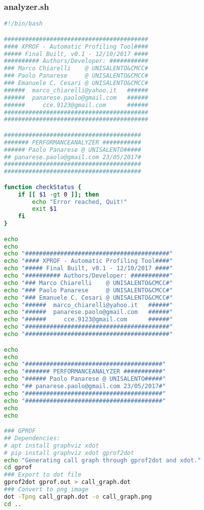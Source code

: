 \subsubsection{analyzer.sh}
\begin{lstlisting}[language=bash,breaklines=true]
#!/bin/bash

#########################################
#### XPROF - Automatic Profiling Tool####
##### Final Built, v0.1 - 12/10/2017 ####
########## Authors/Developer: ###########
### Marco Chiarelli    @ UNISALENTO&CMCC#
### Paolo Panarese     @ UNISALENTO&CMCC#
### Emanuele C. Cesari @ UNISALENTO&CMCC#
######  marco_chiarelli@yahoo.it   ######
######  panarese.paolo@gmail.com   ######
######     cce.9123@gmail.com      ######
#########################################
#########################################

#######################################
####### PERFORMANCEANALYZER ###########
###### Paolo Panarese @ UNISALENTO#####
## panarese.paolo@gmail.com 23/05/2017#
#######################################
#######################################

function checkStatus {
	if [[ $1 -gt 0 ]]; then
		echo "Error reached, Quit!"
		exit $1
	fi
}

echo
echo
echo "#########################################"
echo "#### XPROF - Automatic Profiling Tool####"
echo "##### Final Built, v0.1 - 12/10/2017 ####"
echo "########## Authors/Developer: ###########"
echo "### Marco Chiarelli    @ UNISALENTO&CMCC#"
echo "### Paolo Panarese     @ UNISALENTO&CMCC#"
echo "### Emanuele C. Cesari @ UNISALENTO&CMCC#"
echo "######  marco_chiarelli@yahoo.it   ######"
echo "######  panarese.paolo@gmail.com   ######"
echo "######     cce.9123@gmail.com      ######"
echo "#########################################"
echo "#########################################"

echo
echo
echo "#######################################"
echo "####### PERFORMANCEANALYZER ###########"
echo "###### Paolo Panarese @ UNISALENTO#####"
echo "## panarese.paolo@gmail.com 23/05/2017#"
echo "#######################################"
echo "#######################################"
echo
echo

### GPROF
## Dependencies:
# apt install graphviz xdot
# pip install graphviz xdot gprof2dot
echo "Generating call graph through gprof2dot and xdot."
cd gprof
### Export to dot file
gprof2dot gprof.out > call_graph.dot
### Convert to png image
dot -Tpng call_graph.dot -o call_graph.png
cd ..


\end{lstlisting}

